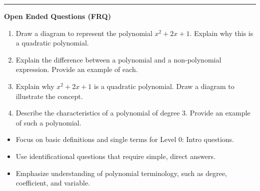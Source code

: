 \documentclass[10pt]{article}
\begin{document}
\vspace{-0.2cm}
\hrule
\vspace{0.2cm}
\textbf{\small Open Ended Questions (FRQ)}
\begin{enumerate}[label=\textbf{Q\arabic*.}, start=9, itemsep=5pt, topsep=0pt]

  \item \small Draw a diagram to represent the polynomial $x^2 + 2x + 1$. Explain why this is a quadratic polynomial. \vspace{2cm}

  \item \small Explain the difference between a polynomial and a non-polynomial expression. Provide an example of each. \vspace{2cm}

  \item \small Explain why $x^2 + 2x + 1$ is a quadratic polynomial. Draw a diagram to illustrate the concept. \vspace{2cm}

  \item \small Describe the characteristics of a polynomial of degree 3. Provide an example of such a polynomial. \vspace{2cm}

\end{enumerate}

\vfill

\begin{tcolorbox}[colback=blue!5, colframe=mainblue!50, title=\small \textbf{Chef's Tips}, fonttitle=\bfseries, bottom=1mm]
\begin{itemize}[noitemsep, topsep=2pt, leftmargin=0.5cm]
  \item \scriptsize Focus on basic definitions and single terms for Level 0: Intro questions.\item \scriptsize Use identificational questions that require simple, direct answers.\item \scriptsize Emphasize understanding of polynomial terminology, such as degree, coefficient, and variable.
\end{itemize}
\end{tcolorbox}
\end{document}
